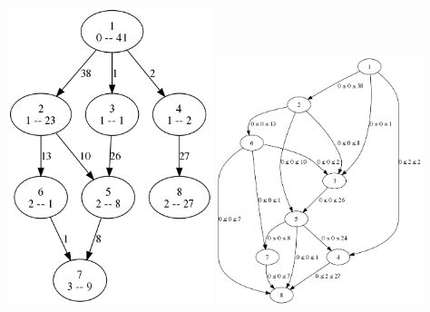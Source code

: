   \includegraphics[width=0.45\textwidth]{img/0-level-graph.png}
  \includegraphics[width=0.45\textwidth]{img/1-graph.png}

